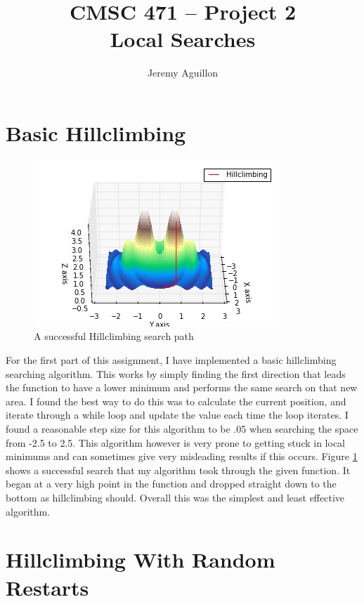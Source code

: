 \documentclass{article}
\begin{document}
\title{	CMSC 471 -- Project 2\\ 
	Local Searches}
\author{Jeremy Aguillon}

\maketitle

\newpage

\section{Basic Hillclimbing}

\begin{figure}
	\centering
	\includegraphics[scale=1]{hillclimbingSearchFinal.jpg}
	\caption{A successful Hillclimbing search path}
	\label{fig:hillclimbingSearchFinal}
\end{figure}

For the first part of this assignment, I have implemented a basic hillclimbing searching algorithm. This works by simply finding the first direction that leads the function to have a lower minimum and performs the same search on that new area. I found the best way to do this was to calculate the current position, and iterate through a while loop and update the value each time the loop iterates. I found a reasonable step size for this algorithm to be .05 when searching the space from -2.5 to 2.5. This algorithm however is very prone to getting stuck in local minimums and can sometimes give very misleading results if this occurs. Figure \ref{fig:hillclimbingSearchFinal} shows a successful search that my algorithm took through the given function. It began at a very high point in the function and dropped straight down to the bottom as hillclimbing should. Overall this was the simplest and least effective algorithm.

\section{Hillclimbing With Random Restarts}
\end{document}
